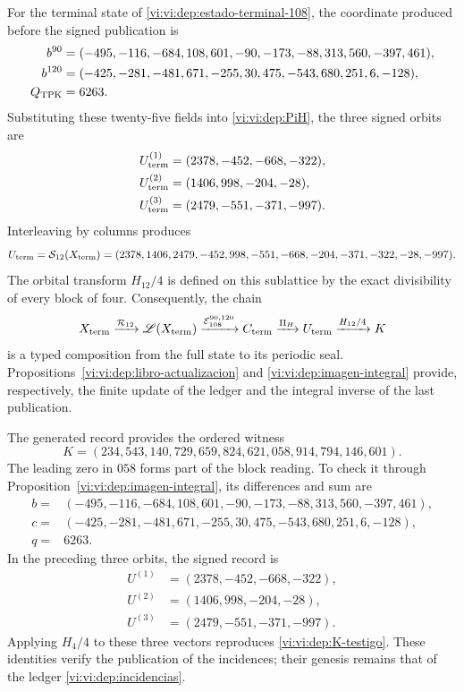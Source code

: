 For the terminal state of \eqref{vi:vi:dep:estado-terminal-108}, the coordinate
produced before the signed publication is
\begin{align}
 b^{90}={}&(-495,-116,-684,108,601,-90,
              -173,-88,313,560,-397,461),\notag\\
 b^{120}={}&(-425,-281,-481,671,-255,30,
               475,-543,680,251,6,-128),\notag\\
 Q_{\rm TPK}={}&6263.
 \label{vi:vi:dep:canales-terminales}
\end{align}
Substituting these twenty-five fields into \eqref{vi:vi:dep:PiH}, the three
signed orbits are
\begin{align*}
 U_{\rm term}^{(1)}&=(2378,-452,-668,-322),\\
 U_{\rm term}^{(2)}&=(1406,998,-204,-28),\\
 U_{\rm term}^{(3)}&=(2479,-551,-371,-997).
\end{align*}
Interleaving by columns produces
\begin{equation}
 U_{\rm term}=\mathcal S_{12}(X_{\rm term})
 =(2378,1406,2479,-452,998,-551,-668,-204,-371,-322,-28,-997).
 \label{vi:vi:dep:U-terminal}
\end{equation}
The orbital transform \(H_{12}/4\) is defined on this sublattice by
the exact divisibility of every block of four. Consequently, the chain
\begin{equation}
 X_{\rm term}\xrightarrow{\mathcal R_{12}}\mathscr L(X_{\rm term})
 \xrightarrow{\mathcal E_{108}^{90,120}}C_{\rm term}
 \xrightarrow{\Pi_H}U_{\rm term}
 \xrightarrow{H_{12}/4}K
 \label{vi:vi:dep:cadena-terminal-completa}
\end{equation}
is a typed composition from the full state to its periodic seal.
Propositions~\ref{vi:vi:dep:libro-actualizacion} and
\ref{vi:vi:dep:imagen-integral} provide, respectively, the finite update
of the ledger and the integral inverse of the last publication.

The generated record provides the ordered witness
\begin{equation}
 K=(234,543,140,729,659,824,621,058,914,794,146,601).
 \label{vi:vi:dep:K-testigo}
\end{equation}
The leading zero in \(058\) forms part of the block reading.
To check it through Proposition~\ref{vi:vi:dep:imagen-integral}, its differences
and sum are
\[
\begin{split}
b={}&(-495,-116,-684,108,601,-90,-173,-88,313,560,-397,461),\\
c={}&(-425,-281,-481,671,-255,30,475,-543,680,251,6,-128),\\
q={}&6263.
\end{split}
\]
In the preceding three orbits, the signed record is
\[
 \begin{aligned}
 U^{(1)}&=(2378,-452,-668,-322),\\
 U^{(2)}&=(1406,998,-204,-28),\\
 U^{(3)}&=(2479,-551,-371,-997).
 \end{aligned}
\]
Applying \(H_4/4\) to these three vectors reproduces
\eqref{vi:vi:dep:K-testigo}. These identities verify the publication of
the incidences; their genesis remains that of the ledger
\eqref{vi:vi:dep:incidencias}.

